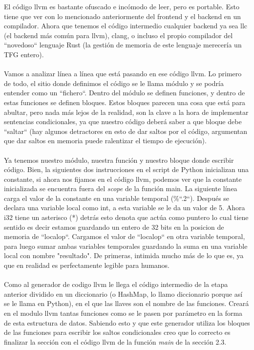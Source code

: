 El código llvm es bastante ofuscado e incómodo de leer, pero es portable. Esto tiene que ver con lo mencionado anteriormente del frontend y el backend en un compilador. Ahora que tenemos el código intermedio cualquier backend ya sea llc (el backend más común para llvm), clang, o incluso el propio compilador del ``novedoso`` lenguaje Rust (la gestión de memoria de este lenguaje merecería un TFG entero).\\\\
Vamos a analizar línea a línea que está pasando en ese código llvm. Lo primero de todo, el sitio donde definimos el código se le llama módulo y se podría entender como un ``fichero``. Dentro del módulo se definen funciones, y dentro de estas funciones se definen bloques. Estos bloques parecen una cosa que está para abultar, pero nada más lejos de la realidad, son la clave a la hora de implementar sentencias condicionales, ya que nuestro código deberá saber a que bloque debe ``saltar`` (hay algunos detractores en esto de dar saltos por el código, argumentan que dar saltos en memoria puede ralentizar el tiempo de ejecución).\\\\ Ya tenemos nuestro módulo, nuestra función y nuestro bloque donde escribir código. Bien, la siguientes dos instrucciones en el script de Python inicializan una constante, si ahora nos fijamos en el código llvm, podemos ver que la constante inicializada se encuentra fuera del \textit{scope} de la función main. La siguiente línea carga el valor de la constante en una variable temporal (\%``.2``).  Después se declara una variable local como int, a esta variable se le da un valor de 5. Ahora i32 tiene un asterisco (*) detrás esto denota que actúa como puntero lo cual tiene sentido es decir estamos guardando un entero de 32 bits en la posicion de memoria de ``localop``. Cargamos el valor de ``localop`` en otra variable temporal, para luego sumar ambas variables temporales guardando la suma en una variable local con nombre "resultado". De primeras, intimida mucho más de lo que es, ya que en realidad es perfectamente legible para humanos.
\\\\
Como al generador de codigo llvm le llega el código intermedio de la etapa anterior dividido en un diccionario (o HashMap, lo llamo diccionario porque así se le llama en Python), en el que las llaves son el nombre de las funciones. Creará en el modulo llvm tantas funciones como se le pasen por parámetro en la forma de esta estructura de datos. Sabiendo esto y que este generador utiliza los bloques de las funciones para escribir los saltos condicionales creo que lo correcto es finalizar la sección con el código llvm de la función \textit{main} de la sección 2.3.
